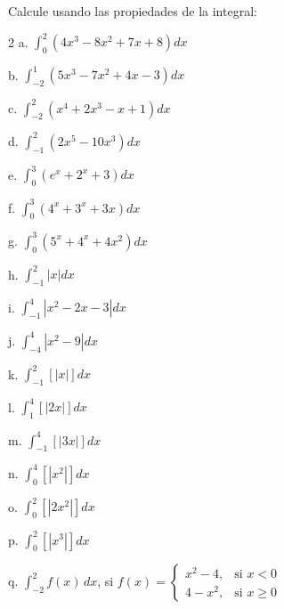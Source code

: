 
\begin{ejer}{Calcule usando las propiedades de la integral:}

\begin{multicols}{2}
a. $\displaystyle\int_{0}^{2}\left( 4x^{3}-8x^{2}+7x+8\right) dx$


b. $\displaystyle\int_{-2}^{1}\left( 5x^{3}-7x^{2}+4x-3\right) dx$


c. $\displaystyle\int_{-2}^{2}\left( x^{4}+2x^{3}-x+1\right) dx$


d. $\displaystyle\int_{-1}^{2}\left( 2x^{5}-10x^{3}\right) dx$


e. $\displaystyle\int_{0}^{3}\left( e^{x}+2^{x}+3\right) dx$


f. $\displaystyle\int_{0}^{3}\left( 4^{x}+3^{x}+3x\right) dx$


g. $\displaystyle\int_{0}^{3}\left(5^{x}+4^{x}+4x^{2}\right) dx$


h. $\displaystyle\int_{-1}^{2}\left\vert x\right\vert dx$


i. $\displaystyle\int_{-1}^{4}\left\vert x^{2}-2x-3\right\vert dx$


j. $\displaystyle\int_{-4}^{4}\left\vert x^{2}-9\right\vert dx$


k. $\displaystyle\int_{-1}^{2}\left[ \left\vert x\right\vert \right] dx$


l. $\displaystyle\int_{1}^{4}\left[ \left\vert 2x\right\vert \right] dx$


m. $\displaystyle\int_{-1}^{4}\left[ \left\vert 3x\right\vert \right] dx$


n. $\displaystyle\int_{0}^{4}\left[ \left\vert x^{2}\right\vert \right] dx$


o. $\displaystyle\int_{0}^{2}\left[ \left\vert 2x^{2}\right\vert \right] dx$


p. $\displaystyle\int_{0}^{2}\left[ \left\vert x^{3}\right\vert \right] dx$


q. $\displaystyle\int_{-2}^{2}f(x)\,dx$, si $f(x)=
\begin{cases}
x^{2}-4, & \text{si }x<0 \\
4-x^{2}, & \text{si }x\geq 0
\end{cases}$



\end{multicols}
\end{ejer}
